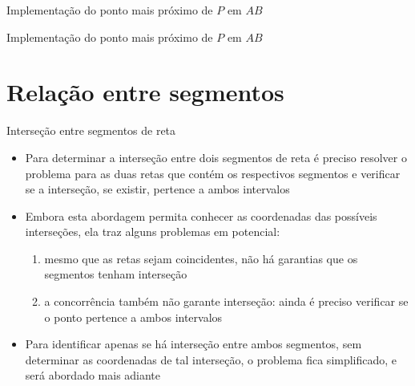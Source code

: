 \begin{frame}[fragile]{Implementação do ponto mais próximo de $P$ em $AB$}
\end{frame}

\begin{frame}[fragile]{Implementação do ponto mais próximo de $P$ em $AB$}
\end{frame}

\section{Relação entre segmentos}

\begin{frame}[fragile]{Interseção entre segmentos de reta}

    \begin{itemize}
        \item Para determinar a interseção entre dois segmentos de reta é preciso resolver o
            problema para as duas retas que contém os respectivos segmentos e verificar se a interseção, se existir, pertence a ambos intervalos
        \pause

        \item Embora esta abordagem permita conhecer as coordenadas das possíveis interseções, ela              traz alguns problemas em potencial:
        \pause

        \begin{enumerate}
            \item mesmo que as retas sejam coincidentes, não há garantias que os segmentos
                tenham interseção
        \pause

            \item a concorrência também não garante interseção: ainda é preciso verificar se o ponto pertence a ambos intervalos
        \end{enumerate}
        \pause

        \item Para identificar apenas se há interseção entre ambos segmentos, sem determinar
            as coordenadas de tal interseção, o problema fica simplificado, e será abordado
            mais adiante
    \end{itemize}

\end{frame}

